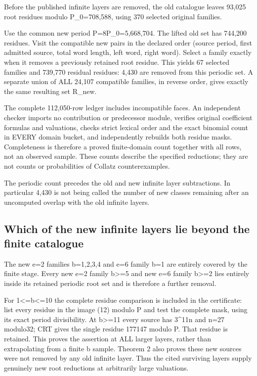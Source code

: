 
Before the published infinite layers are removed, the old catalogue
leaves 93,025 root residues modulo P\_0=708,588, using 370 selected
original families.

Use the common new period P=8P\_0=5,668,704. The lifted old set has
744,200 residues. Visit the compatible new pairs in the declared order
(source period, first admitted source, total word length, left word,
right word). Select a family exactly when it removes a previously
retained root residue. This yields 67 selected families and 739,770
residual residues: 4,430 are removed from this periodic set. A separate
union of ALL 24,107 compatible families, in reverse order, gives exactly
the same resulting set R\_new.

The complete 112,050-row ledger includes incompatible faces. An
independent checker imports no contribution or predecessor module,
verifies original coefficient formulas and valuations, checks strict
lexical order and the exact binomial count in EVERY domain bucket, and
independently rebuilds both residue masks. Completeness is therefore a
proved finite-domain count together with all rows, not an observed
sample. These counts describe the specified reductions; they are not
counts or probabilities of Collatz counterexamples.

The periodic count precedes the old and new infinite layer subtractions.
In particular 4,430 is not being called the number of new classes
remaining after an uncomputed overlap with the old infinite layers.

\subsection{Which of the new infinite layers lie beyond the finite
catalogue}

The new e=2 families b=1,2,3,4 and e=6 family b=1 are entirely covered
by the finite stage. Every new e=2 family b\textgreater=5 and new e=6
family b\textgreater=2 lies entirely inside its retained periodic root
set and is therefore a further removal.

For 1\textless=b\textless=10 the complete residue comparison is included
in the certificate: list every residue in the image (12) modulo P and
test the complete mask, using its exact period divisibility. At
b\textgreater=11 every source has 3\^{}11\textbar n and n=27 modulo32;
CRT gives the single residue 177147 modulo P. That residue is retained.
This proves the assertion at ALL larger layers, rather than
extrapolating from a finite b sample. Theorem 2 also proves these new
sources were not removed by any old infinite layer. Thus the cited
surviving layers supply genuinely new root reductions at arbitrarily
large valuations.

